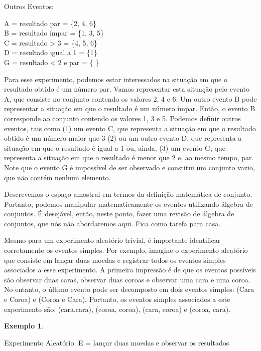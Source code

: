 \documentclass[
]{book}
\theoremstyle{definition}
\theoremstyle{definition}
\newtheorem{example}{Exemplo}[chapter]
\theoremstyle{definition}
\theoremstyle{remark}
\begin{document}
Outros Eventos:

A = resultado par = \{2, 4, 6\}\\
B = resultado ímpar = \{1, 3, 5\}\\
C = resultado \textgreater{} 3 = \{4, 5, 6\}\\
D = resultado igual a 1 = \{1\}\\
G = resultado \textless{} 2 e par = \{ \}

Para esse experimento, podemos estar interessados na situação em que o resultado obtido é um número par. Vamos representar esta situação pelo evento A, que consiste no conjunto contendo os valores 2, 4 e 6. Um outro evento B pode representar a situação em que o resultado é um número ímpar. Então, o evento B corresponde ao conjunto contendo os valores 1, 3 e 5. Podemos definir outros eventos, tais como (1) um evento C, que representa a situação em que o resultado obtido é um número maior que 3 (2) ou um outro evento D, que representa a situação em que o resultado é igual a 1 ou, ainda, (3) um evento G, que representa a situação em que o resultado é menor que 2 e, ao mesmo tempo, par. Note que o evento G é impossível de ser observado e constitui um conjunto vazio, que não contém nenhum elemento.

Descrevemos o espaço amostral em termos da definição matemática de conjunto. Portanto, podemos manipular matematicamente os eventos utilizando álgebra de conjuntos. É desejável, então, neste ponto, fazer uma revisão de álgebra de conjuntos, que nós não abordaremos aqui. Fica como tarefa para casa.

Mesmo para um experimento aleatório trivial, é importante identificar corretamente os eventos simples. Por exemplo, imagine o experimento aleatório que consiste em lançar duas moedas e registrar todos os eventos simples associados a esse experimento. A primeira impressão é de que os eventos possíveis são observar duas caras, observar duas coroas e observar uma cara e uma coroa. No entanto, o último evento pode ser decomposto em dois eventos simples: (Cara e Coroa) e (Coroa e Cara). Portanto, os eventos simples associados a este experimento são: (cara,cara), (coroa, coroa), (cara, coroa) e (coroa, cara).

\begin{example}
\protect\hypertarget{exm:unnamed-chunk-2}{}{\label{exm:unnamed-chunk-2} }
\end{example}

Experimento Aleatório: E = lançar duas moedas e observar os resultados
\end{document}
